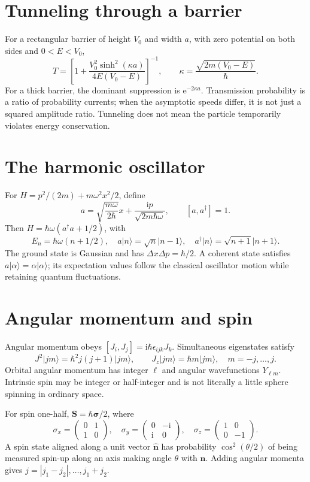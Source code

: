 \documentclass[11pt,oneside]{book}
\newcommand{\ii}{\mathrm{i}}
\newcommand{\ee}{\mathrm{e}}
\newcommand{\vect}[1]{\boldsymbol{#1}}
\newcommand{\ket}[1]{\lvert #1\rangle}
\theoremstyle{reviewstyle}
\begin{document}
\section{Tunneling through a barrier}
For a rectangular barrier of height $V_0$ and width $a$, with zero potential on both sides and $0<E<V_0$,
\begin{equation}T=\left[1+\frac{V_0^2\sinh^2(\kappa a)}{4E(V_0-E)}\right]^{-1},\qquad \kappa=\frac{\sqrt{2m(V_0-E)}}\hbar.\end{equation}
For a thick barrier, the dominant suppression is $\ee^{-2\kappa a}$. Transmission probability is a ratio of probability currents; when the asymptotic speeds differ, it is not just a squared amplitude ratio. Tunneling does not mean the particle temporarily violates energy conservation.
\section{The harmonic oscillator}
For $H=p^2/(2m)+m\omega^2x^2/2$, define
\begin{equation}a=\sqrt{\frac{m\omega}{2\hbar}}x+\frac{\ii p}{\sqrt{2m\hbar\omega}},\qquad [a,a^\dagger]=1.\end{equation}
Then $H=\hbar\omega(a^\dagger a+1/2)$, with
\begin{equation}E_n=\hbar\omega(n+1/2),\quad a\ket n=\sqrt n\ket{n-1},\quad a^\dagger\ket n=\sqrt{n+1}\ket{n+1}.\end{equation}
The ground state is Gaussian and has $\Delta x\Delta p=\hbar/2$. A coherent state satisfies $a\ket\alpha=\alpha\ket\alpha$; its expectation values follow the classical oscillator motion while retaining quantum fluctuations.
\section{Angular momentum and spin}
Angular momentum obeys $[J_i,J_j]=\ii\hbar\epsilon_{ijk}J_k$. Simultaneous eigenstates satisfy
\begin{equation}J^2\ket{jm}=\hbar^2j(j+1)\ket{jm},\qquad J_z\ket{jm}=\hbar m\ket{jm},\quad m=-j,\ldots,j.\end{equation}
Orbital angular momentum has integer $\ell$ and angular wavefunctions $Y_{\ell m}$. Intrinsic spin may be integer or half-integer and is not literally a little sphere spinning in ordinary space.

For spin one-half, $\vect S=\hbar\vect\sigma/2$, where
\begin{equation}\sigma_x=\begin{pmatrix}0&1\\1&0\end{pmatrix},\quad \sigma_y=\begin{pmatrix}0&-\ii\\\ii&0\end{pmatrix},\quad \sigma_z=\begin{pmatrix}1&0\\0&-1\end{pmatrix}.\end{equation}
A spin state aligned along a unit vector $\hat{\vect n}$ has probability $\cos^2(\theta/2)$ of being measured spin-up along an axis making angle $\theta$ with $\hat{\vect n}$. Adding angular momenta gives $j=|j_1-j_2|,\ldots,j_1+j_2$.
\end{document}
